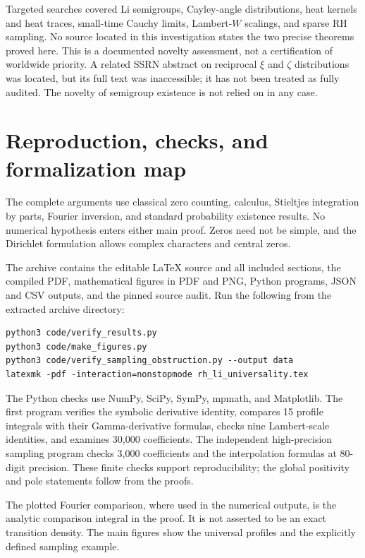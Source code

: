 \documentclass[11pt,a4paper]{article}
\theoremstyle{definition}
\theoremstyle{remark}
\numberwithin{equation}{section}
\begin{document}
Targeted searches covered Li semigroups, Cayley-angle distributions,
heat kernels and heat traces, small-time Cauchy limits, Lambert-$W$
scalings, and sparse RH sampling. No source located in this
investigation states the two precise theorems proved here. This is a
documented novelty assessment, not a certification of worldwide
priority. A related SSRN abstract on reciprocal $\xi$ and $\zeta$
distributions was located, but its full text was inaccessible; it has
not been treated as fully audited. The novelty of semigroup existence
is not relied on in any case.

\section{Reproduction, checks, and formalization map}

The complete arguments use classical zero counting, calculus,
Stieltjes integration by parts, Fourier inversion, and standard
probability existence results. No numerical hypothesis enters either
main proof. Zeros need not be simple, and the Dirichlet formulation
allows complex characters and central zeros.

The archive contains the editable LaTeX source and all included
sections, the compiled PDF, mathematical figures in PDF and PNG,
Python programs, JSON and CSV outputs, and the pinned source audit.
Run the following from the extracted archive directory:
\begin{verbatim}
python3 code/verify_results.py
python3 code/make_figures.py
python3 code/verify_sampling_obstruction.py --output data
latexmk -pdf -interaction=nonstopmode rh_li_universality.tex
\end{verbatim}
The Python checks use NumPy, SciPy, SymPy, mpmath, and Matplotlib.
The first program verifies the symbolic derivative identity, compares
15 profile integrals with their Gamma-derivative formulas, checks nine
Lambert-scale identities, and examines 30,000 coefficients. The
independent high-precision sampling program checks 3,000 coefficients
and the interpolation formulas at 80-digit precision. These finite
checks support reproducibility; the global positivity and pole
statements follow from the proofs.

The plotted Fourier comparison, where used in the numerical outputs,
is the analytic comparison integral in the proof. It is not asserted
to be an exact transition density. The main figures show the universal
profiles and the explicitly defined sampling example.
\end{document}
